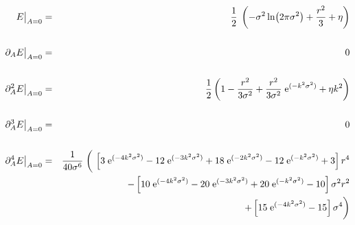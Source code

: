 \begin{small}
\begin{eqnarray*}
E\big\vert_{A=0}&=&\frac{1}{2}\;\left(-\sigma^2\ln\!\left(2\pi\sigma^2\right)+\frac{r^2}{3}+\eta\right)\\
&&\\
\partial_A E\big\vert_{A=0}&=&0\\
&&\\
\partial_A^2 E\big\vert_{A=0}&=&\frac{1}{2}\left(1-\frac{r^2}{3\sigma^2}+\frac{r^2}{3\sigma^2}\;{\rm e}^{(-k^2\sigma^2)}+\eta k^2\right)\\
&&\\
\partial_A^3 E\big\vert_{A=0}&=&0\\
&&\\
\partial_A^4 E\big\vert_{A=0}&=&\frac{1}{40\sigma^6}\;\bigg(\,\left[ 3\;{\rm e}^{(-4k^2\sigma^2)}-12\;{\rm e}^{(-3k^2\sigma^2)}+18\;{\rm e}^{(-2k^2\sigma^2)}-12\;{\rm e}^{(-k^2\sigma^2)}+3 \right] r^4\\
&&\qquad\;\;\,-\left[ 10\;{\rm e}^{(-4k^2\sigma^2)}-20\;{\rm e}^{(-3k^2\sigma^2)}+20\;{\rm e}^{(-k^2\sigma^2)}-10 \right] \sigma^2 r^2\\
&&\qquad\;\;\,+\left[ 15\;{\rm e}^{(-4k^2\sigma^2)}-15 \right] \sigma^4 \bigg)
\end{eqnarray*}
\end{small}
